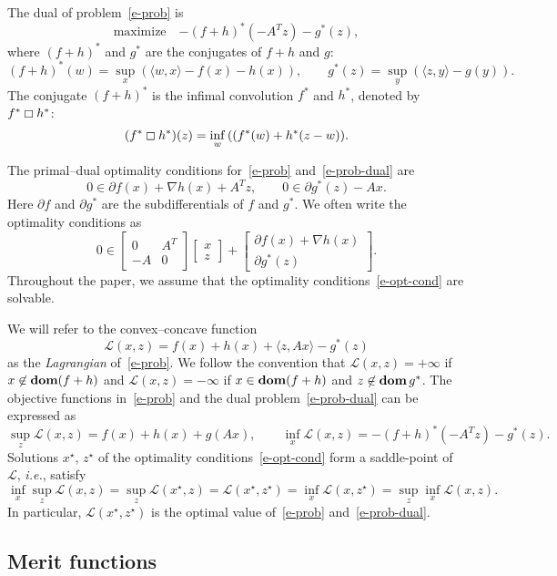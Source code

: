 \documentclass[letterpaper,11pt]{article}
\newcommand{\BEQ}{\begin{equation}}
\newcommand{\EEQ}{\end{equation}}
\newcommand{\ie}{{\it i.e.}}
\newcommand{\dom}{\mathop{\bf dom}}
\newcommand{\inprod}[2]{\langle#1, #2\rangle}
\newcommand{\cL}{\mathcal L}
\begin{document}
The dual of problem~\eqref{e-prob} is
\BEQ \label{e-prob-dual}
 \mbox{maximize}\quad  {-(f+h)^*(-A^Tz) - g^*(z)},
\EEQ
where $(f+h)^*$ and $g^*$ are the conjugates of $f+h$ and $g$:
\[
 (f+h)^*(w) = \sup_x{(\inprod{w}{x} - f(x) - h(x))}, \qquad
 g^*(z) = \sup_y{(\inprod{z}{y} - g(y))}.
\]
The conjugate $(f+h)^*$ is the infimal convolution 
$f^*$ and $h^*$, denoted by $f^* \boxempty h^*$:
\[
(f^* \boxempty h^*) (z) = \inf_w{((f^*(w) + h^*(z-w))}.
\]

The primal--dual optimality conditions for~\eqref{e-prob}
and~\eqref{e-prob-dual} are
\[
 0 \in \partial f(x) + \nabla h(x) + A^T z, \qquad
 0 \in \partial g^*(z) - Ax.
\]
Here $\partial f$ and $\partial g^*$ are the subdifferentials of
$f$ and  $g^*$.  We often write the optimality conditions as
\begin{equation} \label{e-opt-cond}
  0 \in \begin{bmatrix} 0 & A^T \\ -A & 0 \end{bmatrix}
  \begin{bmatrix} x \\ z \end{bmatrix} + \begin{bmatrix}
    \partial f(x)+\nabla h(x) \\ \partial g^\ast(z)
\end{bmatrix}.
\end{equation}
Throughout the paper, we assume that the optimality 
conditions~\eqref{e-opt-cond} are solvable.

We will refer to the convex--concave function
\[
\cL(x,z) = f(x)+h(x)+ \inprod{z}{Ax} -g^\ast(z)
\]
as the \emph{Lagrangian} of~\eqref{e-prob}.
We follow the convention that $\cL(x,z) = +\infty$ if $x\not\in \dom(f+h)$
and $\cL(x,z) = -\infty$ if $x\in\dom(f+h)$ and $z\not\in \dom g^*$.
The objective functions in~\eqref{e-prob} and
the dual problem~\eqref{e-prob-dual} can be expressed as
\[
\sup_z \cL(x,z) = f(x)+h(x)+g(Ax), \qquad
\inf_x \cL(x,z)  = -(f+h)^\ast(-A^Tz)-g^\ast(z).
\]
Solutions $x^\star$, $z^\star$ of the optimality 
conditions~\eqref{e-opt-cond} form a saddle-point of $\cL$, \ie, satisfy
\BEQ \label{e-gap}
\inf_x \sup_z \cL(x, z) = \sup_z \cL(x^\star, z) = 
\cL(x^\star, z^\star) = 
\inf_x \cL(x,z^\star) = \sup_z \inf_x \cL(x,z).
\EEQ
In particular, $\cL(x^\star, z^\star)$ is the optimal value 
of~\eqref{e-prob} and~\eqref{e-prob-dual}.

\subsection{Merit functions}
\end{document}
